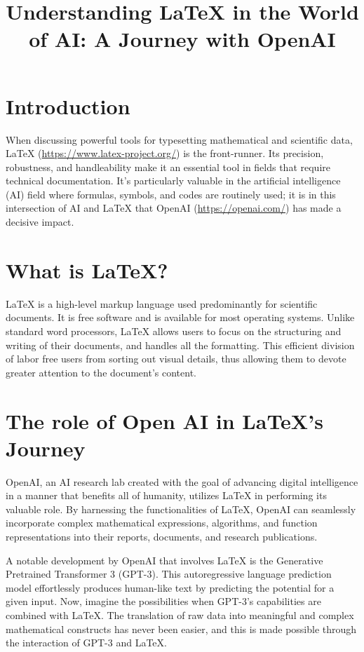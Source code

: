 \title{Understanding LaTeX in the World of AI: A Journey with OpenAI}



\section{Introduction}

When discussing powerful tools for typesetting mathematical and scientific data, LaTeX (\url{https://www.latex-project.org/}) is the front-runner. Its precision, robustness, and handleability make it an essential tool in fields that require technical documentation. It's particularly valuable in the artificial intelligence (AI) field where formulas, symbols, and codes are routinely used; it is in this intersection of AI and LaTeX that OpenAI (\url{https://openai.com/}) has made a decisive impact.

\section{What is LaTeX?}
LaTeX is a high-level markup language used predominantly for scientific documents. It is free software and is available for most operating systems. Unlike standard word processors, LaTeX allows users to focus on the structuring and writing of their documents, and handles all the formatting. This efficient division of labor free users from sorting out visual details, thus allowing them to devote greater attention to the document's content.

\section{The role of Open AI in LaTeX's Journey}
OpenAI, an AI research lab created with the goal of advancing digital intelligence in a manner that benefits all of humanity, utilizes LaTeX in performing its valuable role. By harnessing the functionalities of LaTeX, OpenAI can seamlessly incorporate complex mathematical expressions, algorithms, and function representations into their reports, documents, and research publications.


A notable development by OpenAI that involves LaTeX is the Generative Pretrained Transformer 3 (GPT-3). This autoregressive language prediction model effortlessly produces human-like text by predicting the potential for a given input. Now, imagine the possibilities when GPT-3's capabilities are combined with LaTeX. The translation of raw data into meaningful and complex mathematical constructs has never been easier, and this is made possible through the interaction of GPT-3 and LaTeX.

